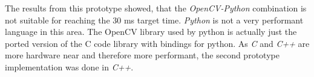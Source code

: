 The results from this prototype showed, that the \textit{OpenCV-Python} combination is not suitable for reaching the 30 ms target time. \textit{Python} is not a very performant language in this area. The OpenCV library used by python is actually just the ported version of the C code library with bindings for python. As \textit{C} and \textit{C++} are more hardware near and therefore more performant, the second prototype implementation was done in \textit{C++}.
\begin{table}[ht]
\centering
\caption{Speed measurements for the used implementations}
\label{Speed measurements for the used implementations}
\end{table}
